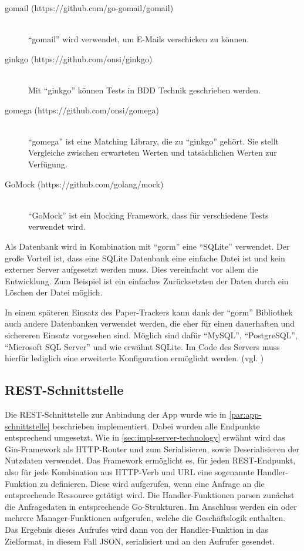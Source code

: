 \begin{description}
	\item[gomail (https://github.com/go-gomail/gomail)] \hfill \\
		\enquote{gomail} wird verwendet, um E-Mails verschicken zu können.
	\item[ginkgo (https://github.com/onsi/ginkgo)] \hfill \\
		Mit \enquote{ginkgo} können Tests in \gls{BDD} Technik geschrieben werden.
	\item[gomega (https://github.com/onsi/gomega)] \hfill \\
		\enquote{gomega} ist eine Matching Library, die zu \enquote{ginkgo} gehört. Sie stellt Vergleiche zwischen erwarteten Werten und tatsächlichen Werten zur Verfügung.
	\item[GoMock (https://github.com/golang/mock)] \hfill \\
		\enquote{GoMock} ist ein Mocking Framework, dass für verschiedene Tests verwendet wird.
\end{description}

Als Datenbank wird in Kombination mit \enquote{gorm} eine \enquote{SQLite} verwendet.
Der große Vorteil ist, dass eine SQLite Datenbank eine einfache Datei ist und kein externer Server aufgesetzt werden muss.
Dies vereinfacht vor allem die Entwicklung.
Zum Beispiel ist ein einfaches Zurücksetzten der Daten durch ein Löschen der Datei möglich.

In einem späteren Einsatz des Paper-Trackers kann dank der \enquote{gorm} Bibliothek auch andere Datenbanken verwendet werden, die eher für einen dauerhaften und sichereren Einsatz vorgesehen sind.
Möglich sind dafür \enquote{MySQL}, \enquote{PostgreSQL}, \enquote{Microsoft SQL Server} und wie erwähnt SQLite.
Im Code des Servers muss hierfür lediglich eine erweiterte Konfiguration ermöglicht werden. (vgl. \cite{Jinzhu2020})

\subsection{REST-Schnittstelle}

Die \gls{REST}-Schnittstelle zur Anbindung der App wurde wie in \autoref{par:app-schnittstelle}
beschrieben implementiert.
Dabei wurden alle Endpunkte entsprechend umgesetzt.
Wie in \autoref{sec:impl-server-technology} erwähnt wird das Gin-Framework als
\gls{HTTP}-Router und zum Serialisieren, sowie Deserialisieren der Nutzdaten verwendet.
Das Framework ermöglicht es, für jeden \gls{REST}-Endpunkt, also für jede Kombination aus
\gls{HTTP}-Verb und \gls{URL} eine sogenannte Handler-Funktion zu definieren. Diese wird aufgerufen,
wenn eine Anfrage an die entsprechende Ressource getätigt wird. Die Handler-Funktionen parsen
zunächst die Anfragedaten in entsprechende Go-Strukturen. Im Anschluss werden ein oder mehrere
Manager-Funktionen aufgerufen, welche die Geschäftslogik enthalten. Das Ergebnis dieses Aufrufes
wird dann von der Handler-Funktion in das Zielformat, in diesem Fall \gls{JSON}, serialisiert und an
den Aufrufer gesendet.

